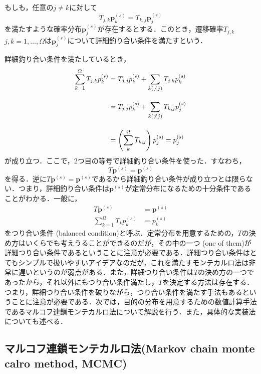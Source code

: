 \begin{kotak}
	\begin{definition}
	もしも，任意の$j\neq k$に対して
	\begin{equation}
	    T_{j,k}\bm{p}^{(s)}_k = T_{k,j}\bm{p}^{(s)}_j
	\end{equation}
	を満たすような確率分布$\bm{p}^{(s)}_j$が存在するとする．このとき，遷移確率$T_{j,k}$ $j,k=1,\ldots,\Omega$は$\bm{p}^{(s)}_j$について詳細釣り合い条件を満たすという．
	\end{definition}
\end{kotak}

詳細釣り合い条件を満たしているとき，
\begin{align}
    \sum_{k=1}^{\Omega} T_{j,k}p_k^{(s)}
    &=T_{j,j}p_k^{(s)} + \sum_{k(\neq j)} T_{j,k}p_k^{(s)}\nn[10pt]
    &=T_{j,j}p_k^{(s)} + \sum_{k(\neq j)} T_{k,j}p_j^{(s)}\nn[10pt]
    &=\left(\sum_{k}^{\Omega} T_{k,j}\right)p_j^{(s)}=p_j^{(s)}
\end{align}
が成り立つ．ここで，2つ目の等号で詳細釣り合い条件を使った．すなわち，
\begin{equation}
    T\bm{p}^{(s)}=\bm{p}^{(s)}
\end{equation}
を得る．逆に$T\bm{p}^{(s)}=\bm{p}^{(s)}$であるから詳細釣り合い条件が成り立つとは限らない．つまり，詳細釣り合い条件は$\bm{p}^{(s)}$が定常分布になるための十分条件であることがわかる．一般に，
\begin{align}
    T\bm{p}^{(s)}&=\bm{p}^{(s)}\\[10pt]
    \sum_{k=1}^{\Omega}T_{k}p^{(s)}_k&=p^{(s)}_k
\end{align}
をつり合い条件 (balanced condition)と呼ぶ．定常分布を用意するための，$T$の決め方はいくらでも考えうることができるのだが，その中の一つ (one of them)が詳細つり合い条件であるということに注意が必要である．詳細つり合い条件はとてもシンプルで扱いやすいアイデアなのだが，これを満たすモンテカルロ法は非常に遅いというのが弱点がある．また，詳細つり合い条件は$T$の決め方の一つであったから，それ以外にもつり合い条件満たし，$T$を決定する方法は存在する．つまり，詳細つり合い条件を破りながら，つり合い条件を満たす手法もあるということに注意が必要である．次では，目的の分布を用意するための数値計算手法であるマルコフ連鎖モンテカルロ法について解説を行う．また，具体的な実装法についても述べる．




\subsection{マルコフ連鎖モンテカルロ法(Markov chain monte calro method, MCMC)}
